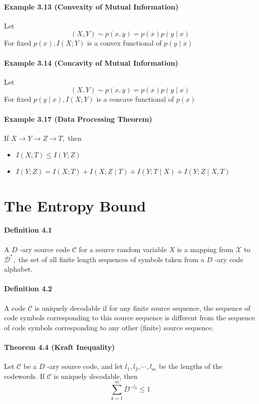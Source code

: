\documentclass[8pt]{article}
\begin{document}
\paragraph{Example 3.13 (Convexity of Mutual Information)} Let
$$
(X, Y) \sim p(x, y)=p(x) p(y \mid x)
$$
For fixed $p(x), I(X ; Y)$ is a convex functional of $p(y \mid x)$

\paragraph{Example 3.14 (Concavity of Mutual Information)} Let
$$
(X, Y) \sim p(x, y)=p(x) p(y \mid x)
$$
For fixed $p(y \mid x), I(X ; Y)$ is a concave functional of $p(x)$

\paragraph{Example 3.17 (Data Processing Theorem)} If $X \rightarrow Y \rightarrow Z \rightarrow T,$ then
\begin{itemize}
	\item $I(X ; T) \leq I(Y ; Z)$
	\item $I(Y ; Z)=I(X ; T)+I(X ; Z \mid T)+I(Y ; T \mid X)+I(Y ; Z \mid X, T)$
\end{itemize}

\section{The Entropy Bound}
\paragraph{Definition 4.1} A $D$ -ary source code $\mathcal{C}$ for a source random variable $X$ is a mapping from $\mathcal{X}$ to $\mathcal{D}^{*},$ the set of all finite length sequences of symbols taken from a $D$ -ary code alphabet.

\paragraph{Definition 4.2} A code $\mathcal{C}$ is uniquely decodable if for any finite source sequence, the sequence of code symbols corresponding to this source sequence is different from the sequence of code symbols corresponding to any other (finite) source
sequence.

\paragraph{Theorem 4.4 (Kraft Inequality)} Let $\mathcal{C}$ be a $D$ -ary source code, and let $l_{1}, l_{2}, \cdots, l_{m}$ be the lengths of the codewords. If $\mathcal{C}$ is uniquely decodable, then
$$
\sum_{k=1}^{m} D^{-l_{k}} \leq 1
$$
\end{document}
